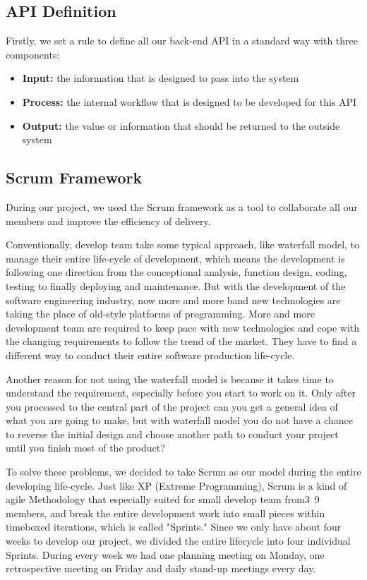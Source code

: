 \documentclass[runningheads]{llncs}
\begin{document}
\subsection{API Definition}
Firstly, we set a rule to define all our back-end API in a standard way with three components:
\begin{itemize}
	\item \textbf{Input:} the information that is designed to pass into the system
	\item \textbf{Process:} the internal workflow that is designed to be developed for this API
	\item \textbf{Output:} the value or information that should be returned to the outside system
\end{itemize}

\subsection{Scrum Framework}
During our project, we used the Scrum framework\cite{scrumdevelopment} as a tool to collaborate all our members and improve the efficiency of delivery.

Conventionally, develop team take some typical approach, like waterfall model, to manage their entire life-cycle of development, which means the development is following one direction from the conceptional analysis, function design, coding, testing to finally deploying and maintenance. But with the development of the software engineering industry, now more and more band new technologies are taking the place of old-style platforms of programming. More and more development team are required to keep pace with new technologies and cope with the changing requirements to follow the trend of the market. They have to find a different way to conduct their entire software production life-cycle.

Another reason for not using the waterfall model is because it takes time to understand the requirement, especially before you start to work on it\cite{sutherland2004agile}. Only after you processed to the central part of the project can you get a general idea of what you are going to make, but with waterfall model you do not have a chance to reverse the initial design and choose another path to conduct your project until you finish most of the product?

To solve these problems, we decided to take Scrum as our model during the entire developing life-cycle. Just like XP (Extreme Programming), Scrum is a kind of agile Methodology that especially suited for small develop team from3~9 members, and break the entire development work into small pieces within timeboxed iterations, which is called "Sprints." Since we only have about four weeks to develop our project, we divided the entire lifecycle into four individual Sprints. During every week we had one planning meeting on Monday, one retrospective meeting on Friday and daily stand-up meetings every day.
\end{document}
